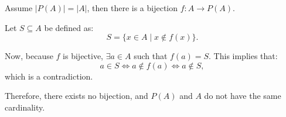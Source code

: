 



Assume $|P(A)| = |A|$, then there is a bijection $f: A \to P(A)$.

Let $S \subseteq A$ be defined as:
\[
S = \{x \in A \mid x \notin f(x)\}.
\]

Now, because $f$ is bijective, $\exists a \in A$ such that $f(a) = S$. This implies that:
\[
a \in S \iff a \notin f(a) \iff a \notin S,
\]
which is a contradiction. 

Therefore, there exists no bijection, and $P(A)$ and $A$ do not have the same cardinality.

